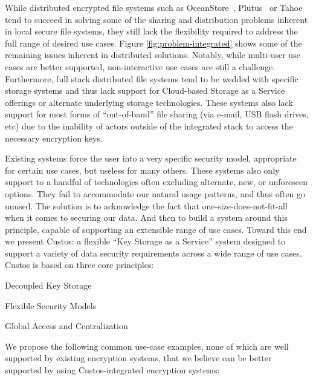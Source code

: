 While distributed encrypted file systems such as
OceanStore~\cite{Kubiatowicz2000}, Plutus~\cite{Kallahalla2003} or
Tahoe~\cite{Wilcox-O'Hearn2008} tend to succeed in solving some of the
sharing and distribution problems inherent in local secure file
systems, they still lack the flexibility required to address the full
range of desired use cases. Figure \ref{fig:problem-integrated} shows
some of the remaining issues inherent in distributed
solutions. Notably, while multi-user use cases are better supported,
non-interactive use cases are still a challenge. Furthermore, full
stack distributed file systems tend to be wedded with specific storage
systems and thus lack support for Cloud-based Storage as a Service
offerings or alternate underlying storage technologies. These systems
also lack support for most forms of ``out-of-band'' file sharing (via
e-mail, USB flash drives, etc) due to the inability of actors outside
of the integrated stack to access the necessary encryption keys.

Existing systems force the user into a very specific security model,
appropriate for certain use cases, but useless for many others. These
systems also only support to a handful of technologies often excluding
alternate, new, or unforeseen options. They fail to accommodate our
natural usage patterns, and thus often go unused. The solution is to
acknowledge the fact that one-size-does-not-fit-all when it comes to
securing our data. And then to build a system around this principle,
capable of supporting an extensible range of use cases. Toward this
end we present Custos: a flexible ``Key Storage as a Service'' system
designed to support a variety of data security requirements across a
wide range of use cases. Custos is based on three core principles:

\begin{packed_item}
\item Decoupled Key Storage
\item Flexible Security Models
\item Global Access and Centralization
\end{packed_item}

We propose the following common use-case examples, none of which are
well supported by existing encryption systems, that we believe can be
better supported by using Custos-integrated encryption systems:

